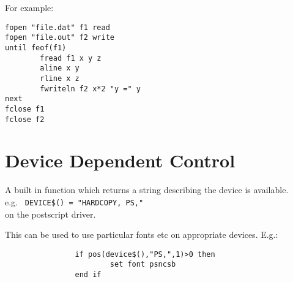 For example:

\preglecode{}
\begin{Verbatim}
fopen "file.dat" f1 read
fopen "file.out" f2 write
until feof(f1)
        fread f1 x y z
        aline x y
        rline x z
        fwriteln f2 x*2 "y =" y
next
fclose f1
fclose f2
\end{Verbatim}
\postglecode{}

\section{Device Dependent Control}
A built in function which returns a string describing 
the device is available. \\e.g. \verb# DEVICE$() = "HARDCOPY, PS,"#\\
on the postscript driver.

This can be used to use particular fonts etc on appropriate
devices. E.g.:

\preglecode{}
\begin{Verbatim}
                if pos(device$(),"PS,",1)>0 then
                        set font psncsb
                end if 
\end{Verbatim}
\postglecode{}
